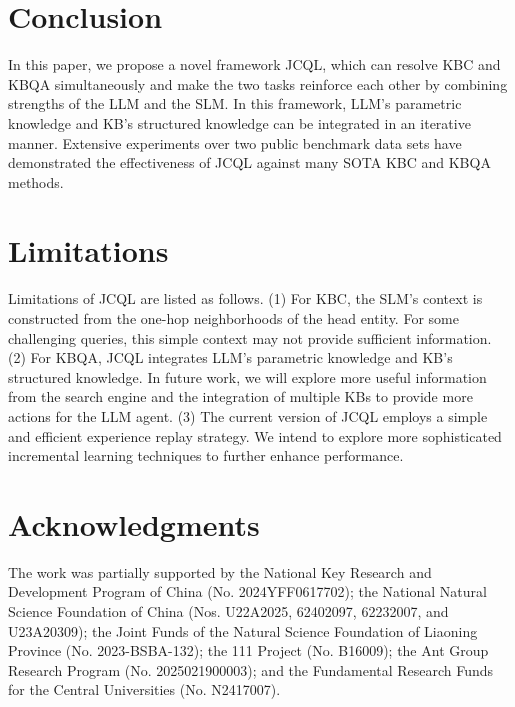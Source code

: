 \documentclass[11pt]{article}
\begin{document}
\section{Conclusion}
In this paper, we propose a novel framework JCQL, which can resolve KBC and KBQA simultaneously and make the two tasks reinforce each other by combining strengths of the LLM and the SLM. In this framework, LLM's parametric knowledge and KB's structured knowledge can be integrated in an iterative manner. Extensive experiments over two public benchmark data sets have demonstrated the effectiveness of JCQL against many SOTA KBC and KBQA methods.

\section*{Limitations} 
Limitations of JCQL are listed as follows. 
(1) For KBC, the SLM's context is constructed from the one-hop neighborhoods of the head entity. For some challenging queries, this simple context may not provide sufficient information.
(2) For KBQA, JCQL integrates LLM's parametric knowledge and KB's structured knowledge. In future work, we will explore more useful information from the search engine and the integration of multiple KBs to provide more actions for the LLM agent.
(3) The current version of JCQL employs a simple and efficient experience replay strategy. We intend to explore more sophisticated incremental learning techniques to further enhance performance.

\section*{Acknowledgments}
The work was partially supported by the National Key Research and Development Program of China (No. 2024YFF0617702); the National Natural Science Foundation of China (Nos. U22A2025, 62402097, 62232007, and U23A20309); the Joint Funds of the Natural Science Foundation of Liaoning Province (No. 2023-BSBA-132); the 111 Project (No. B16009); the Ant Group Research Program (No. 2025021900003); and the Fundamental Research Funds for the Central Universities (No. N2417007).


%


\clearpage
\appendix

\end{document}
